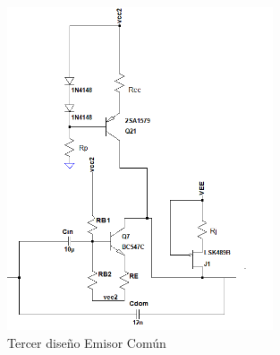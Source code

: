  \begin{figure}[H]
\centering
	\includegraphics[width=0.7\textwidth]{ImagenesGain-Stage/ec3.png}
	\caption{Tercer diseño Emisor Común}
	\label{fig:ec3}
\end{figure}

